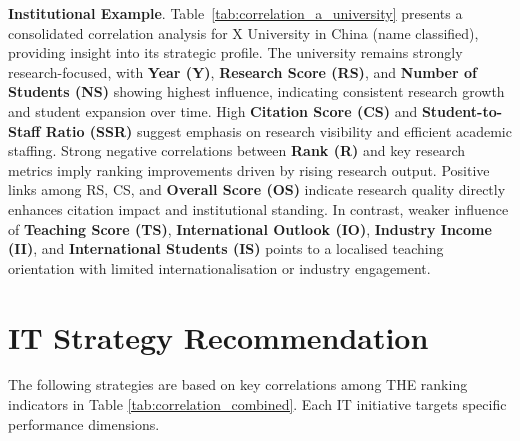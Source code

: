 \documentclass[conference]{IEEEtran}
\begin{document}
\textbf{Institutional Example}. Table~\ref{tab:correlation_a_university} presents a consolidated correlation analysis for X University in China (name classified), providing insight into its strategic profile. The university remains strongly research-focused, with \textbf{Year (Y)}, \textbf{Research Score (RS)}, and \textbf{Number of Students (NS)} showing highest influence, indicating consistent research growth and student expansion over time. High \textbf{Citation Score (CS)} and \textbf{Student-to-Staff Ratio (SSR)} suggest emphasis on research visibility and efficient academic staffing. Strong negative correlations between \textbf{Rank (R)} and key research metrics imply ranking improvements driven by rising research output. Positive links among RS, CS, and \textbf{Overall Score (OS)} indicate research quality directly enhances citation impact and institutional standing. In contrast, weaker influence of \textbf{Teaching Score (TS)}, \textbf{International Outlook (IO)}, \textbf{Industry Income (II)}, and \textbf{International Students (IS)} points to a localised teaching orientation with limited internationalisation or industry engagement.








\section{IT Strategy Recommendation}

The following strategies are based on key correlations among THE ranking indicators in Table \ref{tab:correlation_combined}. Each IT initiative targets specific performance dimensions.
\end{document}
